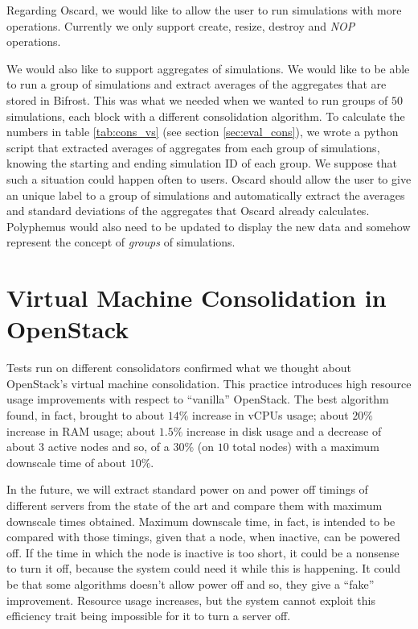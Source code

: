 Regarding Oscard, we would like to allow the user to run simulations with more operations. Currently we only support create, resize, destroy and \textit{NOP} operations.

We would also like to support aggregates of simulations. We would like to be able to run a group of simulations and extract averages of the aggregates that are stored in Bifrost. This was what we needed when we wanted to run groups of $50$ simulations, each block with a different consolidation algorithm. To calculate the numbers in table \ref{tab:cons_vs} (see section \ref{sec:eval_cons}), we wrote a python script that extracted averages of aggregates from each group of simulations, knowing the starting and ending simulation ID of each group. We suppose that such a situation could happen often to users. Oscard should allow the user to give an unique label to a group of simulations and automatically extract the averages and standard deviations of the aggregates that Oscard already calculates. Polyphemus would also need to be updated to display the new data and somehow represent the concept of \emph{groups} of simulations.

\section{Virtual Machine Consolidation in OpenStack}
\label{sec:conc_cons}
Tests run on different consolidators confirmed what we thought about OpenStack's virtual machine consolidation. This practice introduces high resource usage improvements with respect to ``vanilla'' OpenStack. The best algorithm found, in fact, brought to about $14\%$ increase in vCPUs usage; about $20\%$ increase in RAM usage; about $1.5\%$ increase in disk usage and a decrease of about $3$ active nodes and so, of a $30\%$ (on $10$ total nodes) with a maximum downscale time of about $10\%$.

In the future, we will extract standard power on and power off timings of different servers from the state of the art and compare them with maximum downscale times obtained. Maximum downscale time, in fact, is intended to be compared with those timings, given that a node, when inactive, can be powered off. If the time in which the node is inactive is too short, it could be a nonsense to turn it off, because the system could need it while this is happening. It could be that some algorithms doesn't allow power off and so, they give a ``fake'' improvement. Resource usage increases, but the system cannot exploit this efficiency trait being impossible for it to turn a server off.

